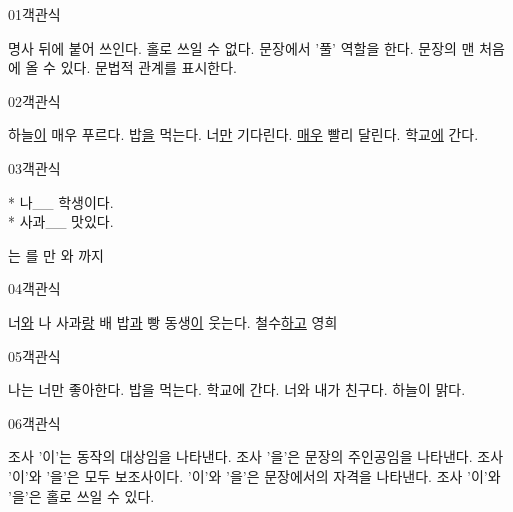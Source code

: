 \documentclass[fs85,seriesRus]{korfarm-base}
\begin{document}

\par\medskip
\kfBeginMC
\begin{kfQBlock}{01}{객관식}
\begin{kfChoices}
\kfChoice 명사 뒤에 붙어 쓰인다.
\kfChoice 홀로 쓰일 수 없다.
\kfChoice 문장에서 '풀' 역할을 한다.
\kfChoice 문장의 맨 처음에 올 수 있다.
\kfChoice 문법적 관계를 표시한다.
\end{kfChoices}
\end{kfQBlock}
\begin{kfQBlock}{02}{객관식}
\begin{kfChoices}
\kfChoice 하늘\uline{이} 매우 푸르다.
\kfChoice 밥\uline{을} 먹는다.
\kfChoice 너\uline{만} 기다린다.
\kfChoice \uline{매우} 빨리 달린다.
\kfChoice 학교\uline{에} 간다.
\end{kfChoices}
\end{kfQBlock}
\begin{kfQBlock}{03}{객관식}
\begin{kfEvidence}* 나\_\_ 학생이다. \\\relax
* 사과\_\_ 맛있다.\end{kfEvidence}
\begin{kfChoices}
\kfChoice 는
\kfChoice 를
\kfChoice 만
\kfChoice 와
\kfChoice 까지
\end{kfChoices}
\end{kfQBlock}
\begin{kfQBlock}{04}{객관식}
\begin{kfChoices}
\kfChoice 너\uline{와} 나
\kfChoice 사과\uline{랑} 배
\kfChoice 밥\uline{과} 빵
\kfChoice 동생\uline{이} 웃는다.
\kfChoice 철수\uline{하고} 영희
\end{kfChoices}
\end{kfQBlock}
\begin{kfQBlock}{05}{객관식}
\begin{kfChoices}
\kfChoice 나는 너만 좋아한다.
\kfChoice 밥을 먹는다.
\kfChoice 학교에 간다.
\kfChoice 너와 내가 친구다.
\kfChoice 하늘이 맑다.
\end{kfChoices}
\end{kfQBlock}
\begin{kfQBlock}{06}{객관식}
\begin{kfChoices}
\kfChoice 조사 '이'는 동작의 대상임을 나타낸다.
\kfChoice 조사 '을'은 문장의 주인공임을 나타낸다.
\kfChoice 조사 '이'와 '을'은 모두 보조사이다.
\kfChoice '이'와 '을'은 문장에서의 자격을 나타낸다.
\kfChoice 조사 '이'와 '을'은 홀로 쓰일 수 있다.
\end{kfChoices}
\end{kfQBlock}
\end{document}
